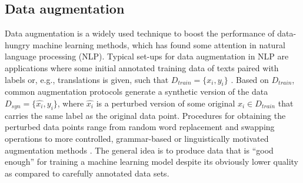 \documentclass[10pt, a4paper]{article}
\begin{document}







\subsection{Data augmentation}

Data augmentation is a widely used technique to boost the performance of data-hungry machine learning methods, which has found some attention in natural language processing (NLP). 
Typical set-ups for data augmentation in NLP are applications where some initial annotated training data of texts paired with labels or, e.g., translations is given, such that $D_{train} = \{x_i,y_i\}$ \cite{kumar-etal-2020-data}. 
Based on $D_{train}$, common augmentation protocols generate a synthetic version of the data $D_{syn} = \{\hat{x_i}, y_i\}$, where $\hat{x_i}$ is a perturbed version of some original $x_i \in D_{train}$ that carries the same label as the original data point.
Procedures for obtaining the perturbed data points range from random word replacement and swapping operations \cite{wang-etal-2018-switchout,wei-zou-2019-eda} to more controlled, grammar-based or linguistically motivated augmentation methods \cite{jia-liang-2016-data,andreas2020good}.
The general idea is to produce data that is ``good enough'' \cite{andreas2020good} for training a machine learning model despite its obviously lower quality as compared to carefully annotated data sets. 
\end{document}
